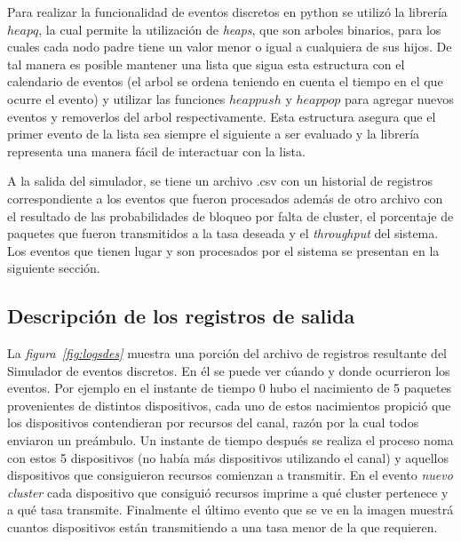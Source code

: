 Para realizar la funcionalidad de eventos discretos en python se utilizó la librería $heapq$, la cual permite la utilización de \textit{heaps}, que son arboles binarios, para los cuales cada nodo padre tiene un valor menor o igual a cualquiera de sus hijos. De tal manera es posible mantener una lista que sigua esta estructura con el calendario de eventos (el arbol se ordena teniendo en cuenta el tiempo en el que ocurre el evento) y utilizar las funciones $heappush$ y $heappop$ para agregar nuevos eventos y removerlos del arbol respectivamente. Esta estructura asegura que el primer evento de la lista sea siempre el siguiente a ser evaluado y la librería representa una manera fácil de interactuar con la lista.\newline

A la salida del simulador, se tiene un archivo .csv con un historial de registros correspondiente a los eventos que fueron procesados además de otro archivo con el resultado de las probabilidades de bloqueo por falta de cluster, el porcentaje de paquetes que fueron transmitidos a la tasa deseada y el \textit{throughput} del sistema. Los eventos que tienen lugar y son procesados por el sistema se presentan en la siguiente sección. \newline 

\subsection{Descripción de los registros de salida}

La \textit{figura~\ref{fig:logsdes}} muestra una porción del archivo de registros resultante del Simulador de eventos discretos. En él se puede ver cúando y donde ocurrieron los eventos. Por ejemplo en el instante de tiempo 0 hubo el nacimiento de 5 paquetes provenientes de distintos dispositivos, cada uno de estos nacimientos propició que los dispositivos contendieran por recursos del canal, razón por la cual todos enviaron un preámbulo. Un instante de tiempo después se realiza el proceso noma con estos 5 dispositivos (no había más dispositivos utilizando el canal) y aquellos dispositivos que consiguieron recursos comienzan a transmitir. En el evento \textit{nuevo cluster} cada dispositivo que consiguió recursos imprime a qué cluster pertenece y a qué tasa transmite. Finalmente el último evento que se ve en la imagen muestrá cuantos dispositivos están transmitiendo a una tasa menor de la que requieren. \newline


